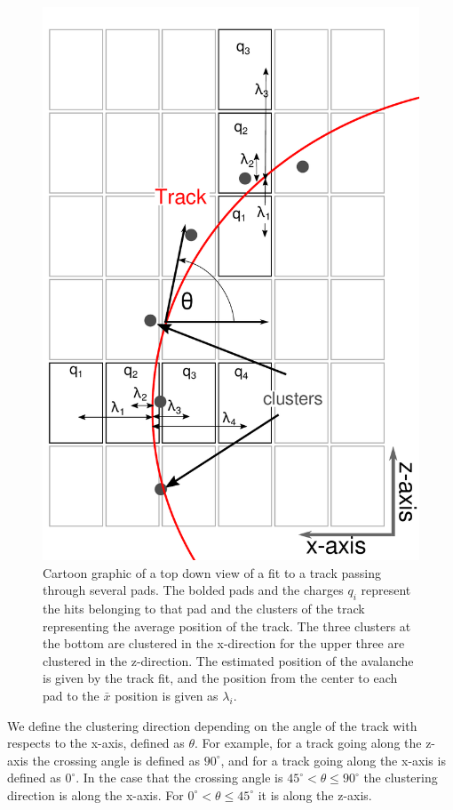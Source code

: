 \documentclass[review]{elsarticle}
\begin{document}
\begin{figure}[ht!]
\includegraphics[scale=.5]{top_view_helix_ext.pdf}
\caption{Cartoon graphic of a top down view of a fit to a track passing through several pads. The bolded pads and the charges $q_i$ represent the hits belonging to that pad and the clusters of the track representing the average position of the track. The three clusters at the bottom are clustered in the x-direction for the upper three are clustered in the z-direction. The estimated position of the avalanche is given by the track fit, and the position from the center to each pad to the $\bar{x}$ position is given as $\lambda_i$.}
\label{fig:topview}
\end{figure}

We define the clustering direction depending on the angle  of the track with respects to the x-axis, defined as $\theta$. For example, for a track going along the z-axis the crossing angle is defined as $90^{\circ}$, and for a track going along the x-axis is defined as $0^{\circ}$. In the case that the crossing angle is $45^{\circ} < \theta \leq 90^{\circ} $ the clustering direction is along the x-axis. For $0^{\circ} < \theta \leq 45^{\circ}$ it is along the z-axis. 
\end{document}
